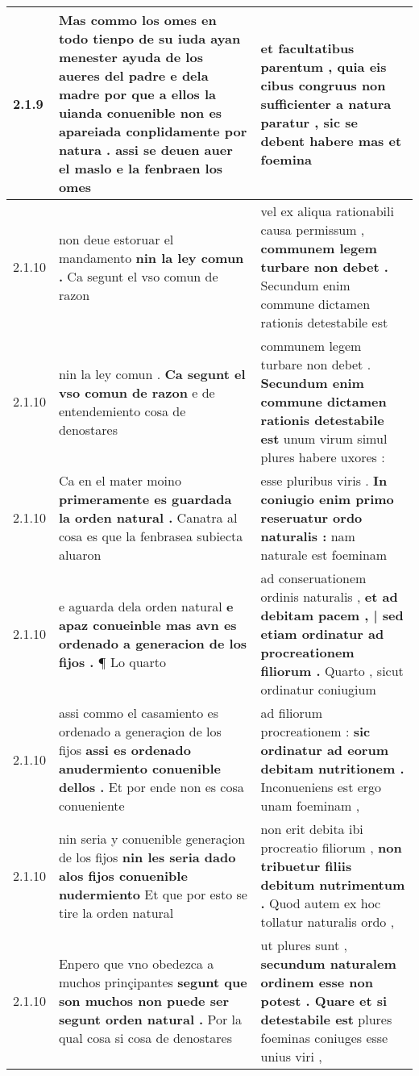 \begin{tabular}{|p{1cm}|p{6.5cm}|p{6.5cm}|}
2.1.9 & Mas commo los omes en todo tienpo de su iuda ayan menester ayuda de los aueres del padre e dela madre \textbf{ por que a ellos la uianda conuenible non es apareiada conplidamente por natura . } assi se deuen auer el maslo e la fenbraen los omes & et facultatibus parentum , \textbf{ quia eis cibus congruus non sufficienter a natura paratur , } sic se debent habere mas et foemina \\\hline
2.1.10 & non deue estoruar el mandamento \textbf{ nin la ley comun . } Ca segunt el vso comun de razon & vel ex aliqua rationabili causa permissum , \textbf{ communem legem turbare non debet . } Secundum enim commune dictamen rationis detestabile est \\\hline
2.1.10 & nin la ley comun . \textbf{ Ca segunt el vso comun de razon } e de entendemiento cosa de denostares & communem legem turbare non debet . \textbf{ Secundum enim commune dictamen rationis detestabile est } unum virum simul plures habere uxores : \\\hline
2.1.10 & Ca en el mater moino \textbf{ primeramente es guardada la orden natural . } Canatra al cosa es que la fenbrasea subiecta aluaron & esse pluribus viris . \textbf{ In coniugio enim primo reseruatur ordo naturalis : } nam naturale est foeminam \\\hline
2.1.10 & e aguarda dela orden natural \textbf{ e apaz conueinble mas avn es ordenado a generacion de los fijos . } ¶ Lo quarto & ad conseruationem ordinis naturalis , \textbf{ et ad debitam pacem , | sed etiam ordinatur ad procreationem filiorum . } Quarto , sicut ordinatur coniugium \\\hline
2.1.10 & assi commo el casamiento es ordenado a generaçion de los fijos \textbf{ assi es ordenado anudermiento conuenible dellos . } Et por ende non es cosa conueniente & ad filiorum procreationem : \textbf{ sic ordinatur ad eorum debitam nutritionem . } Inconueniens est ergo unam foeminam , \\\hline
2.1.10 & nin seria y conuenible generaçion de los fijos \textbf{ nin les seria dado alos fijos conuenible nudermiento } Et que por esto se tire la orden natural & non erit debita ibi procreatio filiorum , \textbf{ non tribuetur filiis debitum nutrimentum . } Quod autem ex hoc tollatur naturalis ordo , \\\hline
2.1.10 & Enpero que vno obedezca a muchos prinçipantes \textbf{ segunt que son muchos non puede ser segunt orden natural . } Por la qual cosa si cosa de denostares & ut plures sunt , \textbf{ secundum naturalem ordinem esse non potest . Quare et si detestabile est } plures foeminas coniuges esse unius viri , \\\hline

\end{tabular}
